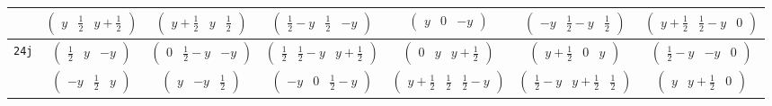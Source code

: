 \documentclass[fleqn,9pt,landscape]{jsarticle}
\begin{document}
\begin{center}
\begin{longtable}{ccccccc}
& $ \begin{pmatrix} y & \frac{1}{2} & y + \frac{1}{2} \end{pmatrix} $ & $ \begin{pmatrix} y + \frac{1}{2} & y & \frac{1}{2} \end{pmatrix} $ & $ \begin{pmatrix} \frac{1}{2} - y & \frac{1}{2} & - y \end{pmatrix} $ & $ \begin{pmatrix} y & 0 & - y \end{pmatrix} $ & $ \begin{pmatrix} - y & \frac{1}{2} - y & \frac{1}{2} \end{pmatrix} $ & $ \begin{pmatrix} y + \frac{1}{2} & \frac{1}{2} - y & 0 \end{pmatrix} $ \\ \hline
{\tt 24j} & $ \begin{pmatrix} \frac{1}{2} & y & - y \end{pmatrix} $ & $ \begin{pmatrix} 0 & \frac{1}{2} - y & - y \end{pmatrix} $ & $ \begin{pmatrix} \frac{1}{2} & \frac{1}{2} - y & y + \frac{1}{2} \end{pmatrix} $ & $ \begin{pmatrix} 0 & y & y + \frac{1}{2} \end{pmatrix} $ & $ \begin{pmatrix} y + \frac{1}{2} & 0 & y \end{pmatrix} $ & $ \begin{pmatrix} \frac{1}{2} - y & - y & 0 \end{pmatrix} $ \\
& $ \begin{pmatrix} - y & \frac{1}{2} & y \end{pmatrix} $ & $ \begin{pmatrix} y & - y & \frac{1}{2} \end{pmatrix} $ & $ \begin{pmatrix} - y & 0 & \frac{1}{2} - y \end{pmatrix} $ & $ \begin{pmatrix} y + \frac{1}{2} & \frac{1}{2} & \frac{1}{2} - y \end{pmatrix} $ & $ \begin{pmatrix} \frac{1}{2} - y & y + \frac{1}{2} & \frac{1}{2} \end{pmatrix} $ & $ \begin{pmatrix} y & y + \frac{1}{2} & 0 \end{pmatrix} $ \\

\end{longtable}
\end{center}
\end{document}
